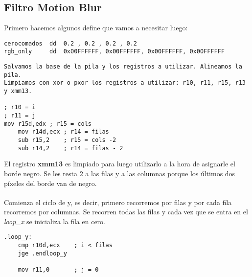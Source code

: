 \documentclass[a4paper]{article}
\begin{document}
\subsection{Filtro Motion Blur}
\indent Primero hacemos algunos define que vamos a necesitar luego:
 \begin{codesnippet}
\begin{verbatim}
cerocomados  dd  0.2 , 0.2 , 0.2 , 0.2
rgb_only     dd  0x00FFFFFF, 0x00FFFFFF, 0x00FFFFFF, 0x00FFFFFF
\end{verbatim}
\end{codesnippet}

 \begin{codesnippet}
\begin{verbatim}
Salvamos la base de la pila y los registros a utilizar. Alineamos la pila.
Limpiamos con xor o pxor los registros a utilizar: r10, r11, r15, r13 y xmm13.

; r10 = i
; r11 = j
mov r15d,edx ; r15 = cols
	mov r14d,ecx ; r14 = filas
	sub r15,2 	 ; r15 = cols -2 
	sub r14,2 	 ; r14 = filas - 2 
\end{verbatim}
\end{codesnippet}

\indent El registro \textbf{xmm13} es limpiado para luego utilizarlo a la hora de asignarle el borde negro. Se les resta 2 a las filas y a las columnas porque los \'ultimos dos p\'ixeles del borde van de negro.\\
\\
\indent Comienza el ciclo de y, es decir, primero recorremos por filas y por cada fila recorremos por columnas. Se recorren todas las filas y cada vez que se entra en el \textit{loop_x} se inicializa la fila en cero.
 \begin{codesnippet}
\begin{verbatim}
.loop_y:
    cmp r10d,ecx 	; i < filas 
    jge .endloop_y
	
    mov r11,0 		; j = 0
\end{verbatim}
\end{codesnippet}
\end{document}

